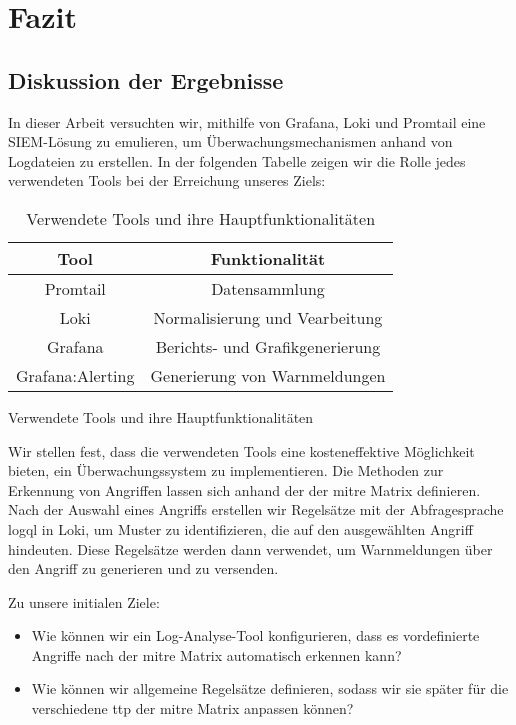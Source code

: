 \section{Fazit}

\subsection{Diskussion der Ergebnisse}
In dieser Arbeit versuchten wir, mithilfe von Grafana, Loki und Promtail eine \gls{SIEM}-Lösung zu emulieren, um Überwachungsmechanismen anhand von Logdateien zu erstellen. In der folgenden Tabelle zeigen wir die Rolle jedes verwendeten Tools bei der Erreichung unseres Ziels:

\begin{table}[h]
    \centering
    \begin{tabular}{|c|c|}
    \hline
    \textbf{Tool}    & \textbf{Funktionalität}         \\ \hline
    Promtail         & Datensammlung                   \\ \hline
    Loki             & Normalisierung und Vearbeitung  \\ \hline
    Grafana          & Berichts- und Grafikgenerierung \\ \hline
    Grafana:Alerting & Generierung von Warnmeldungen   \\ \hline
    \end{tabular}
    \caption{Verwendete Tools und ihre Hauptfunktionalitäten} 
    {Verwendete Tools und ihre Hauptfunktionalitäten}
    \label{tab:VerewendeteTools}
\end{table}

Wir stellen fest, dass die verwendeten Tools eine kosteneffektive Möglichkeit bieten, ein Überwachungssystem zu implementieren. Die Methoden zur Erkennung von Angriffen lassen sich anhand der  der \gls{mitre} Matrix definieren. Nach der Auswahl eines Angriffs erstellen wir Regelsätze mit der Abfragesprache \gls{logql} in Loki, um Muster zu identifizieren, die auf den ausgewählten Angriff hindeuten. Diese Regelsätze werden dann verwendet, um Warnmeldungen über den Angriff zu generieren und zu versenden.

Zu unsere initialen Ziele:

{
\begin{itemize}[noitemsep]
   \item Wie können wir ein Log-Analyse-Tool konfigurieren, dass es vordefinierte Angriffe nach der \gls{mitre} Matrix automatisch erkennen kann? 
   \item Wie können wir allgemeine Regelsätze definieren, sodass wir sie später für die verschiedene \gls{ttp} der \gls{mitre} Matrix anpassen können?
\end{itemize}
}

